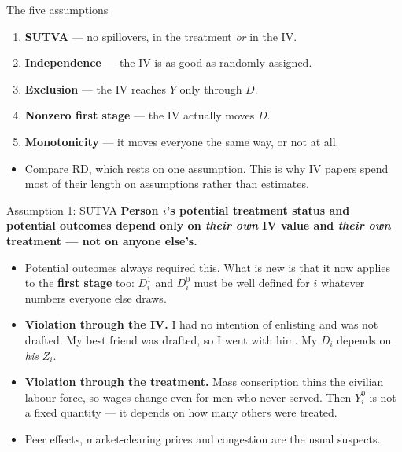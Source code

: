 \documentclass[
  11pt,
  ignorenonframetext,
  aspectratio=169,
]{beamer}
\providecommand{\tightlist}{%
  \setlength{\itemsep}{0pt}\setlength{\parskip}{0pt}}
\begin{document}
\begin{frame}{The five assumptions}
\protect{}\label{the-five-assumptions}
\small

\begin{enumerate}
\tightlist
\item
  \textbf{SUTVA} --- no spillovers, in the treatment \emph{or} in the
  IV.
\item
  \textbf{Independence} --- the IV is as good as randomly assigned.
\item
  \textbf{Exclusion} --- the IV reaches \(Y\) only through \(D\).
\item
  \textbf{Nonzero first stage} --- the IV actually moves \(D\).
\item
  \textbf{Monotonicity} --- it moves everyone the same way, or not at
  all.
\end{enumerate}

\vspace{0.5em}

\begin{itemize}
\tightlist
\item
  Compare RD, which rests on one assumption. This is why IV papers spend
  most of their length on assumptions rather than estimates.
\end{itemize}
\end{frame}

\begin{frame}{Assumption 1: SUTVA}
\protect{}\label{assumption-1-sutva}
\textbf{Person \(i\)'s potential treatment status and potential outcomes
depend only on \emph{their own} IV value and \emph{their own} treatment
--- not on anyone else's.}

\begin{itemize}
\tightlist
\item
  Potential outcomes always required this. What is new is that it now
  applies to the \textbf{first stage} too: \(D^1_i\) and \(D^0_i\) must
  be well defined for \(i\) whatever numbers everyone else draws.
\item
  \textbf{Violation through the IV.} I had no intention of enlisting and
  was not drafted. My best friend was drafted, so I went with him. My
  \(D_i\) depends on \emph{his} \(Z_i\).
\item
  \textbf{Violation through the treatment.} Mass conscription thins the
  civilian labour force, so wages change even for men who never served.
  Then \(Y^0_i\) is not a fixed quantity --- it depends on how many
  others were treated.
\item
  Peer effects, market-clearing prices and congestion are the usual
  suspects.
\end{itemize}
\end{frame}
\end{document}
